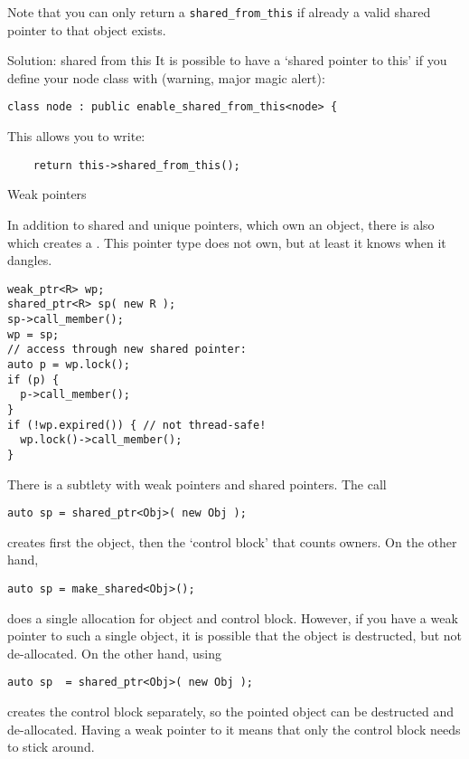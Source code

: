 Note that you can only return a \lstinline+shared_from_this+
if already a valid shared pointer to that object exists.

\begin{slide}{Solution: shared from this}
  \label{sl:share-ptr-node-from}
  It is possible to have a `shared pointer to this' if you
  define your node class with (warning, major magic alert):
\begin{lstlisting}
class node : public enable_shared_from_this<node> {
\end{lstlisting}
This allows you to write:
\begin{lstlisting}
    return this->shared_from_this();
\end{lstlisting}
\end{slide}

 {Weak pointers}
\label{sec:weak_ptr}

In addition to shared and unique pointers, which own an object, there
is also  which creates a
. This pointer type does not own, but
at least it knows when it dangles.

\begin{lstlisting}
weak_ptr<R> wp;
shared_ptr<R> sp( new R );
sp->call_member();
wp = sp;
// access through new shared pointer:
auto p = wp.lock();
if (p) {
  p->call_member();
}
if (!wp.expired()) { // not thread-safe!
  wp.lock()->call_member();
}
\end{lstlisting}

There is a subtlety with weak pointers and shared pointers. The call
\begin{lstlisting}
auto sp = shared_ptr<Obj>( new Obj );
\end{lstlisting}
creates first the object, then the `control block' that counts owners.
On the other hand,
\begin{lstlisting}
auto sp = make_shared<Obj>();
\end{lstlisting}
does a single allocation for object and control block. However, if you
have a weak pointer to such a single object, it is possible that the
object is destructed, but not de-allocated. On the other hand, using
\begin{lstlisting}
auto sp  = shared_ptr<Obj>( new Obj );
\end{lstlisting}
creates the control block separately, so the pointed object can be
destructed and de-allocated. Having a weak pointer to it means that only
the control block needs to stick around.


